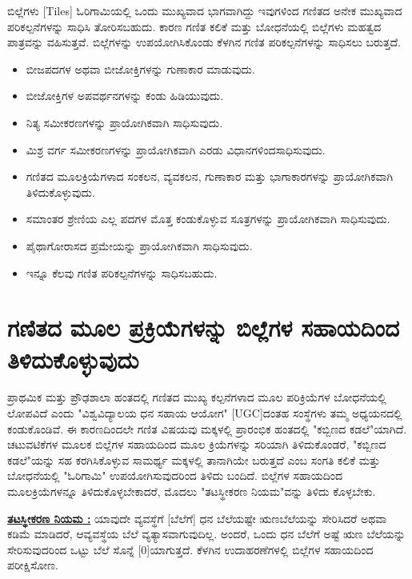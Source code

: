ಬಿಲ್ಲೆಗಳು [Tiles] ಓರಿಗಾಮಿಯಲ್ಲಿ ಒಂದು ಮುಖ್ಯವಾದ ಭಾಗವಾಗಿದ್ದು ಇವುಗಳಿಂದ ಗಣಿತದ ಅನೇಕ ಮುಖ್ಯವಾದ ಪರಿಕಲ್ಪನೆಗಳನ್ನು ಸಾಧಿಸಿ ತೋರಿಸಬಹುದು. ಕಾರಣ ಗಣಿತ ಕಲಿಕೆ ಮತ್ತು ಬೋಧನೆಯಲ್ಲಿ ಬಿಲ್ಲೆಗಳು ಮಹತ್ವದ ಪಾತ್ರವನ್ನು ವಹಿಸುತ್ತವೆ. ಬಿಲ್ಲೆಗಳನ್ನು ಉಪಯೋಗಿಸಿಕೊಂಡು ಕೆಳಗಿನ ಗಣಿತ ಪರಿಕಲ್ಪನೆಗಳನ್ನು ಸಾಧಿಸಲು ಬರುತ್ತದೆ.
\begin{itemize}
\item ಬೀಜಪದಗಳ ಅಥವಾ ಬೀಜೋಕ್ತಿಗಳನ್ನು ಗುಣಾಕಾರ ಮಾಡುವುದು.
\item ಬೀಜೋಕ್ತಿಗಳ ಅಪವರ್ಥನಗಳನ್ನು ಕಂಡು ಹಿಡಿಯುವುದು. 
\item ನಿತ್ಯ ಸಮೀಕರಣಗಳನ್ನು ಪ್ರಾಯೋಗಿಕವಾಗಿ ಸಾಧಿಸುವುದು. 
\item ಮಿಶ್ರ ವರ್ಗ ಸಮೀಕರಣಗಳನ್ನು ಪ್ರಾಯೋಗಿಕವಾಗಿ ಎರಡು ವಿಧಾನಗಳಿಂದ\break ಸಾಧಿಸುವುದು. 
\item ಗಣಿತದ ಮೂಲಕ್ರಿಯೆಗಳಾದ ಸಂಕಲನ, ವ್ಯವಕಲನ, ಗುಣಾಕಾರ ಮತ್ತು ಭಾಗಾ\break ಕಾರಗಳನ್ನು ಪ್ರಾಯೋಗಿಕವಾಗಿ ತಿಳಿದುಕೊಳ್ಳುವುದು. 
\item ಸಮಾಂತರ ಶ್ರೇಣಿಯ ಎಲ್ಲ ಪದಗಳ ಮೊತ್ತ ಕಂಡುಕೊಳ್ಳುವ ಸೂತ್ರಗಳನ್ನು ಪ್ರಾಯೋಗಿಕವಾಗಿ ಸಾಧಿಸುವುದು.
\item ಪೈಥಾಗೋರಾಸದ ಪ್ರಮೇಯನ್ನು ಪ್ರಾಯೋಗಿಕವಾಗಿ ಸಾಧಿಸುವುದು.
\item ಇನ್ನೂ ಕೆಲವು ಗಣಿತ ಪರಿಕಲ್ಪನೆಗಳನ್ನು ಸಾಧಿಸಬಹುದು. 
\end{itemize}

\section{ಗಣಿತದ ಮೂಲ ಪ್ರಕ್ರಿಯೆಗಳನ್ನು ಬಿಲ್ಲೆಗಳ ಸಹಾಯದಿಂದ ತಿಳಿದು\break ಕೊಳ್ಳುವುದು}

ಪ್ರಾಥಮಿಕ ಮತ್ತು ಪ್ರೌಢಶಾಲಾ ಹಂತದಲ್ಲಿ ಗಣಿತದ ಮುಖ್ಯ ಕಲ್ಪನೆಗಳಾದ ಮೂಲ ಪರಿ\-ಕ್ರಿಯೆ\-ಗಳ ಬೋಧನೆಯಲ್ಲಿ ಲೋಪವಿದೆ ಎಂದು "ವಿಶ್ವವಿದ್ಯಾಲಯ ಧನ ಸಹಾಯ ಆಯೋಗ" [UGC]ದಂತಹ ಸಂಸ್ಥೆಗಳು ತಮ್ಮ ಅಧ್ಯಯನದಲ್ಲಿ ಕಂಡುಕೊಂಡಿವೆ. ಈ ಕಾರಣದಿಂದಲೇ ಗಣಿತ ವಿಷಯವು ಮಕ್ಕಳಲ್ಲಿ ಪ್ರಾರಂಭಿಕ ಹಂತದಲ್ಲಿ "ಕಬ್ಬಿಣದ ಕಡಲೆ"ಯಾಗಿದೆ. ಚಟುವಟಿಕೆಗಳ ಮೂಲಕ ಬಿಲ್ಲೆಗಳ ಸಹಾಯದಿಂದ ಮೂಲ ಕ್ರಿಯೆಗಳನ್ನು ಸರಿಯಾಗಿ ತಿಳಿದುಕೊಂಡರೆ, "ಕಬ್ಬಿಣದ ಕಡಲೆ"ಯನ್ನು ಸಹ ಕರಗಿಸಿಕೊಳ್ಳುವ ಸಾಮರ್ಥ್ಯ ಮಕ್ಕಳಲ್ಲಿ ತಾನಾಗಿಯೇ ಬರುತ್ತದೆ ಎಂಬ ಸಂಗತಿ ಕಲಿಕೆ ಮತ್ತು ಬೋಧನೆಯಲ್ಲಿ "ಓರಿಗಾಮಿ" ಉಪಯೋಗಿಸುವುದರಿಂದ ತಿಳಿದು ಬಂದಿದೆ. ಬಿಲ್ಲೆಗಳ ಸಹಾಯದಿಂದ ಮೂಲಕ್ರಿಯೆಗಳನ್ನೂ ತಿಳಿದುಕೊಳ್ಳಬೇಕಾದರೆ, ಮೊದಲು "ತಟಸ್ಥೀಕರಣ ನಿಯಮ"ವನ್ನು ತಿಳಿದು ಕೊಳ್ಳಬೇಕು.

\medskip
\noindent
\textbf{\underline{ತಟಸ್ಥೀಕರಣ ನಿಯಮ :}} ಯಾವುದೇ ವ್ಯವಸ್ಥೆಗೆ [ಬೆಲೆಗೆ] ಧನ ಬೆಲೆಯಷ್ಟೇ ಋಣಬೆಲೆ\-ಯನ್ನು ಸೇರಿಸಿದರೆ ಅಥವಾ ಕಡಿಮೆ ಮಾಡಿದರೆ, ಆವ್ಯವಸ್ಥೆಯ ಬೆಲೆ ವ್ಯತ್ಯಾಸವಾಗುವುದಿಲ್ಲ. \hbox{ಅಂದರೆ}, ಒಂದು ಧನ ಬೆಲೆಗೆ ಅಷ್ಟೆ ಋಣ ಬೆಲೆಯನ್ನು ಸೇರಿಸುವುದರಿಂದ ಒಟ್ಟು ಬೆಲೆ ಸೊನ್ನೆ [0]ಯಾಗುತ್ತದೆ. ಕೆಳಗಿನ ಉದಾಹರಣೆಗಳಲ್ಲಿ ಬಿಲ್ಲೆಗಳ ಸಹಾಯದಿಂದ ಪರೀಕ್ಷಿಸೋಣ.


